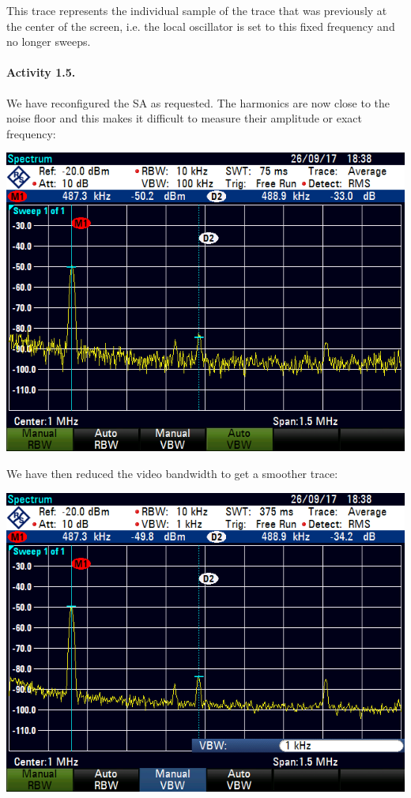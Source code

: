 This trace represents the individual sample of the trace that was previously
at the center of the screen, i.e. the local oscillator is set to this fixed
frequency and no longer sweeps.

\finishpage


\startpage
\paragraph{Activity 1.5.}

We have reconfigured the SA as requested. The harmonics are now close to
the noise floor and this makes it difficult to measure their amplitude or
exact frequency:

\includegraphics[width=\textwidth]{assets/1-5}

We have then reduced the video bandwidth to get a smoother trace:

\includegraphics[width=\textwidth]{assets/1-5-2}

